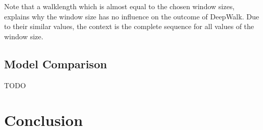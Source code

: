 Note that a walklength which is almost equal to the chosen window sizes, explains why the window size has no influence on the outcome of DeepWalk. Due to their similar values, the context is the complete sequence for all values of the window size.


\subsection{Model Comparison}

TODO

\section{Conclusion}





